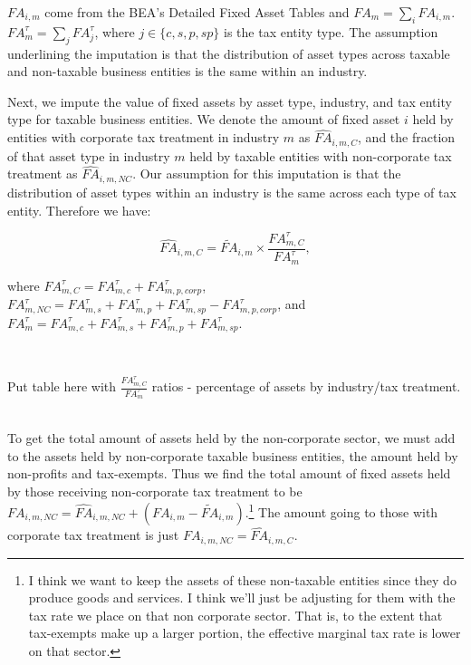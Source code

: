 \documentclass[article,11pt,letterpaper,fleqn]{article}
\theoremstyle{definition}
\numberwithin{equation}{section}
\begin{document}
\noindent\noindent  ${FA}_{i,m}$ come from the BEA's Detailed Fixed Asset Tables and ${FA}_{m}=\sum_{i}{FA}_{i,m}$.  ${FA}^{\tau}_{m}=\sum_{j}{FA}^{\tau}_{j}$, where $j\in\{c,s,p,sp\}$ is the tax entity type.  The assumption underlining the imputation is that the distribution of asset types across taxable and non-taxable business entities is the same within an industry.

Next, we impute the value of fixed assets by asset type, industry, and tax entity type for taxable business entities.  We denote the amount of fixed asset $i$ held by entities with corporate tax treatment in industry $m$ as $\widehat{FA}_{i,m,C}$, and the fraction of that asset type in industry $m$ held by taxable entities with non-corporate tax treatment as $\widehat{FA}_{i,m,NC}$.  Our assumption for this imputation is that the distribution of asset types within an industry is the same across each type of tax entity.  Therefore we have: 

\begin{equation}
\widehat{FA}_{i,m,C}=\widetilde{FA}_{i,m} \times \frac{{FA}^{\tau}_{m,C}}{{FA}^{\tau}_{m}},
\end{equation} 


\noindent\noindent where ${FA}^{\tau}_{m,C}={FA}^{\tau}_{m,c}+{FA}^{\tau}_{m,p,corp}$, ${FA}^{\tau}_{m,NC}={FA}^{\tau}_{m,s}+{FA}^{\tau}_{m,p}+{FA}^{\tau}_{m,sp}-{FA}^{\tau}_{m,p,corp}$, and ${FA}^{\tau}_{m}={FA}^{\tau}_{m,c}+{FA}^{\tau}_{m,s}+{FA}^{\tau}_{m,p}+{FA}^{\tau}_{m,sp}$.

\ \\
\begin{center}
Put table here with $\frac{{FA}^{\tau}_{m,C}}{{FA}^{\tau}_{m}}$ ratios - percentage of assets by industry/tax treatment.
\end{center}
\ \\

To get the total amount of assets held by the non-corporate sector, we must add to the assets held by non-corporate taxable business entities, the amount held by non-profits and tax-exempts.  Thus we find the total amount of fixed assets held by those receiving non-corporate tax treatment to be ${FA}_{i,m,NC}=\widehat{FA}_{i,m,NC}+({FA}_{i,m}-\widetilde{FA}_{i,m})$.\footnote{I think we want to keep the assets of these non-taxable entities since they do produce goods and services. I think we'll just be adjusting for them with the tax rate we place on that non corporate sector.  That is, to the extent that tax-exempts make up a larger portion, the effective marginal tax rate is lower on that sector.}  The amount going to those with corporate tax treatment is just ${FA}_{i,m,NC}=\widehat{FA}_{i,m,C}$.
\end{document}
